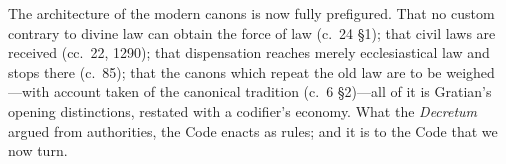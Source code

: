 The architecture of the modern canons is now fully prefigured. That no custom contrary to divine law can obtain the force of law (c.~24 §1); that civil laws are received  (cc.~22, 1290); that dispensation reaches merely ecclesiastical law and stops there (c.~85); that the canons which repeat the old law are to be weighed ---with account taken of the canonical tradition (c.~6 §2)---all of it is Gratian's opening distinctions, restated with a codifier's economy. What the \emph{Decretum} argued from authorities, the Code enacts as rules; and it is to the Code that we now turn.
